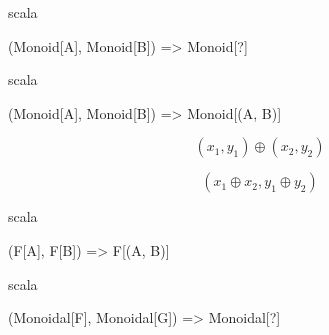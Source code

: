 \documentclass{beamer}
\begin{document}
\begin{frame}[fragile]

  \centering
  \large

  \begin{cminted}{scala}

(Monoid[A], Monoid[B]) => Monoid[?]

  \end{cminted}

\end{frame}

\begin{frame}[fragile]

  \centering
  \large

  \begin{cminted}{scala}

(Monoid[A], Monoid[B]) => Monoid[(A, B)]

  \end{cminted}

\end{frame}

\begin{frame}[fragile]

  \Large

  $$ (x_{1}, y_{1}) \oplus (x_{2}, y_{2}) $$

\end{frame}

\begin{frame}[fragile]

  \centering
  \Large

  $$ (x_{1} \oplus x_{2}, y_{1} \oplus y_{2}) $$

\end{frame}

\begin{frame}[fragile]

  \centering
  \large

  \begin{cminted}{scala}

(F[A], F[B]) => F[(A, B)]

  \end{cminted}

\end{frame}

\begin{frame}[fragile]

  \centering
  \large

  \begin{cminted}{scala}

(Monoidal[F], Monoidal[G]) => Monoidal[?]

  \end{cminted}

\end{frame}
\end{document}

